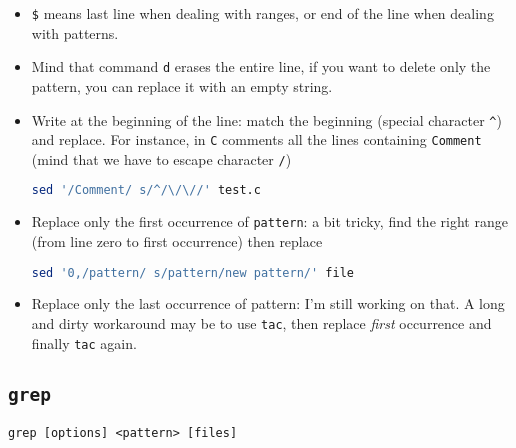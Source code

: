\documentclass[a4paper,12pt,%
              final%
              ]{article}
\begin{document}
\begin{itemize}
  \item \verb|$| means last line when dealing with ranges, or end of the line when dealing with patterns.
  \item Mind that command \verb|d| erases the entire line, if you want to delete only the pattern, you can replace it with an empty string.
  \item Write at the beginning of the line: match the beginning (special character \verb|^|) and replace. For instance, in \texttt{C} comments all the lines containing \texttt{Comment} (mind that we have to escape character \verb|/|)
\begin{lstlisting}[language=bash]
sed '/Comment/ s/^/\/\//' test.c
\end{lstlisting}
  \item Replace only the first occurrence of \verb|pattern|: a bit tricky, find the right range (from line zero to first occurrence) then replace
\begin{lstlisting}[language=bash]
sed '0,/pattern/ s/pattern/new pattern/' file
\end{lstlisting}
  \item Replace only the last occurrence of pattern: I'm still working on that. A long and dirty workaround may be to use \verb|tac|, then replace \emph{first} occurrence and finally \verb|tac| again.
\end{itemize}

\subsection{\texttt{grep}}
\label{ssec:grep}
\verb|grep [options] <pattern> [files]|
\end{document}
